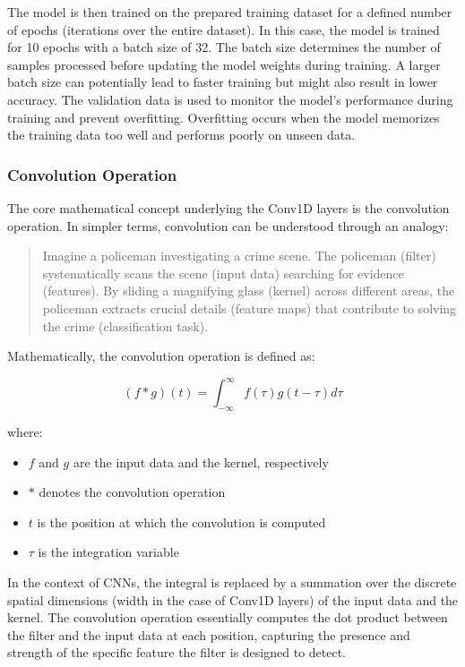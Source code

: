 \documentclass[
	article, %
	11pt, %
]{CSUniSchoolLabReport}
\begin{document}
The model is then trained on the prepared training dataset for a defined number of epochs (iterations over the entire dataset). In this case, the model is trained for 10 epochs with a batch size of 32. The batch size determines the number of samples processed before updating the model weights during training. A larger batch size can potentially lead to faster training but might also result in lower accuracy. The validation data is used to monitor the model's performance during training and prevent overfitting. Overfitting occurs when the model memorizes the training data too well and performs poorly on unseen data.

\subsubsection{Convolution Operation}

The core mathematical concept underlying the Conv1D layers is the convolution operation. In simpler terms, convolution can be understood through an analogy:

\begin{quote}
 Imagine a policeman investigating a crime scene. The policeman (filter) systematically scans the scene (input data) searching for evidence (features). By sliding a magnifying glass (kernel) across different areas, the policeman extracts crucial details (feature maps) that contribute to solving the crime (classification task).
\end{quote}

Mathematically, the convolution operation is defined as:

\begin{equation}
(f * g)(t) = \int_{-\infty}^{\infty} f(\tau)g(t - \tau) d\tau
\end{equation}

where:

\begin{itemize}
  \item $f$ and $g$ are the input data and the kernel, respectively
  \item $*$ denotes the convolution operation
  \item $t$ is the position at which the convolution is computed
  \item $\tau$ is the integration variable
\end{itemize}

In the context of CNNs, the integral is replaced by a summation over the discrete spatial dimensions (width in the case of Conv1D layers) of the input data and the kernel. The convolution operation essentially computes the dot product between the filter and the input data at each position, capturing the presence and strength of the specific feature the filter is designed to detect.
\end{document}
